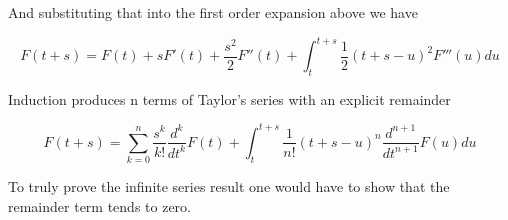 \documentclass{article}
\begin{document}
And substituting that into the first order expansion above we have

\[
F(t+s) = F(t) + s F'(t) + \frac{s^2}{2} F''(t) + \int_{t}^{t+s} \frac{1}{2}(t+s-u)^2 F'''(u) du
\]

Induction produces n terms of Taylor's series with an explicit remainder

\[
F(t+s) = \sum_{k=0}^{n} \frac{s^k}{k!} \frac{d^k}{dt^k} F(t) +
                        \int_{t}^{t+s} \frac{1}{n!}(t+s-u)^n \frac{d^{n+1}}{dt^{n+1}} F(u) du
\]

To truly prove the infinite series result one would have to show that the remainder term tends to zero.

\end{document}

